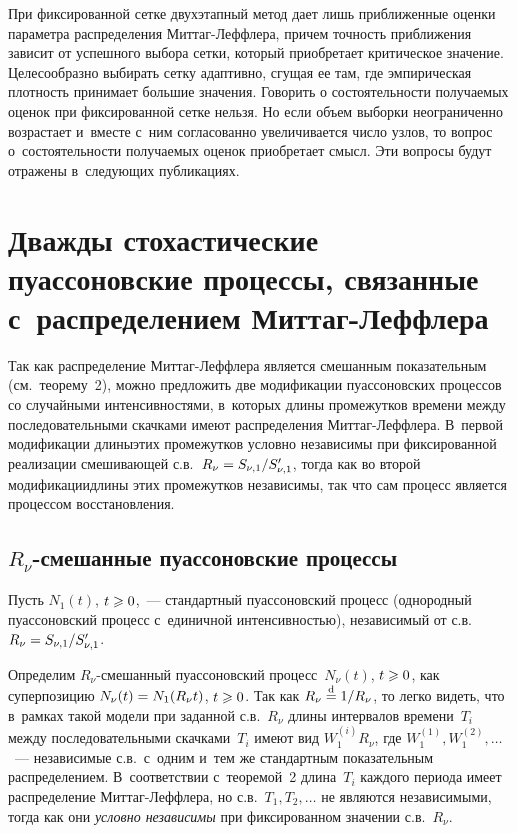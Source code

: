 \begin{multicols}{2}
При фиксированной сетке двухэтапный метод дает лишь приближенные
оценки параметра распределения Мит\-таг-Леф\-фле\-ра, причем точность
приближения зависит от успешного выбора сетки, который приобретает
критическое значение. Целесообразно выбирать сетку адаптивно, сгущая
ее там, где эмпирическая плотность принимает большие значения.
Говорить о состоятельности получаемых оценок при фиксированной сетке
нельзя. Но если объем выборки неограниченно возрастает и~вмес\-те 
с~ним согласованно увеличивается число узлов, то вопрос о~со\-сто\-ятель\-ности 
получаемых оценок приобретает смысл. Эти вопросы
будут отражены в~следующих публикациях.

\vspace*{-8pt}

\section{Дважды стохастические пуассоновские процессы, связанные 
с~распределением Миттаг-Леффлера}

\vspace*{-2pt}

Так как распределение Мит\-таг-Леф\-фле\-ра является смешанным
показательным (см.\ теорему~2), можно предложить две модификации
пуассоновских процессов со случайными интенсивностями, в~которых
длины промежутков времени между последовательными скачками имеют
распределения Мит\-таг-Леф\-фле\-ра. В~первой модификации длины\linebreak этих
промежутков условно независимы при фиксированной реализации
смешивающей с.в.\ $R_{\nu}\hm=S_{\nu,1}/S'_{\nu,1}$, тогда как во
второй модификации\linebreak длины этих промежутков независимы, так что сам
процесс является процессом восстановления.
{

}

\subsection{$R_{\nu}$-смешанные пуассоновские процессы}

Пусть $N_1(t)$, $t\hm\geqslant 0$,~--- стандартный пуассоновский процесс
(однородный пуассоновский процесс с~единичной ин\-тен\-сив\-ностью),
независимый от с.в.~$R_{\nu}\hm=S_{\nu,1}/S'_{\nu,1}$.

Определим $R_{\nu}$-смешанный пуассоновский процесс~$N_{\nu}(t)$,
$t\hm\geqslant0$, как суперпозицию $N_{\nu}(t)\hm=N_1(R_{\nu}t)$, $t\hm\geqslant0$. Так
как $R_{\nu}\hm\eqd 1/R_{\nu}$, то легко видеть, что в~рамках такой
модели при заданной с.в.~$R_{\nu}$ длины интервалов времени~$T_i$
между последовательными скачками~$T_i$ имеют вид $W_1^{(i)}R_{\nu}$,
где $W_1^{(1)},W_1^{(2)},\ldots$~--- независимые с.в.\ с~одним и~тем
же стандартным показательным распределением. В~соответствии 
с~теоремой~2 длина~$T_i$ каждого периода имеет распределение
Мит\-таг-Леф\-фле\-ра, но с.в.\ $T_1,T_2,\ldots$ не являются независимыми,
тогда как они {\it условно независимы} при фиксированном значении с.в.~$R_{\nu}$.


\end{multicols}
